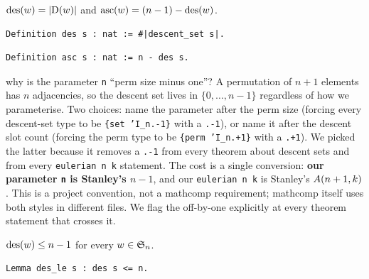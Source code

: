 \begin{definition}
  \label{def:des_asc}
  $\mathrm{des}(w) = |\mathrm{D}(w)|$ and $\mathrm{asc}(w) = (n-1) - \mathrm{des}(w)$.
\end{definition}

\begin{lstlisting}[language=Rocq]
Definition des s : nat := #|descent_set s|.
\end{lstlisting}


\begin{lstlisting}[language=Rocq]
Definition asc s : nat := n - des s.
\end{lstlisting}


\begin{sidebar}{why is the parameter \texttt{n} ``perm size minus one''?}
A permutation of $n+1$ elements has $n$ adjacencies, so the
descent set lives in $\{0, \dots, n-1\}$ regardless of how we
parameterise. Two choices: name the parameter after the perm size
(forcing every descent-set type to be \texttt{\{set 'I\_n.-1\}}
with a \texttt{.-1}), or name it after the descent slot count
(forcing the perm type to be \texttt{\{perm 'I\_n.+1\}} with a
\texttt{.+1}). We picked the latter because it removes a
\texttt{.-1} from every theorem about descent sets and from every
\texttt{eulerian n k} statement. The cost is a single conversion:
\textbf{our parameter \texttt{n} is Stanley's $n-1$}, and our
\texttt{eulerian\,n\,k} is Stanley's $A(n+1, k)$. This
is a project convention, not a mathcomp requirement; mathcomp
itself uses both styles in different files. We flag the off-by-one
explicitly at every theorem statement that crosses it.
\end{sidebar}

\begin{lemma}
  \label{lem:des_le}
  $\mathrm{des}(w) \leq n - 1$ for every $w \in \mathfrak{S}_{n}$.
\end{lemma}

\begin{lstlisting}[language=Rocq]
Lemma des_le s : des s <= n.
\end{lstlisting}


